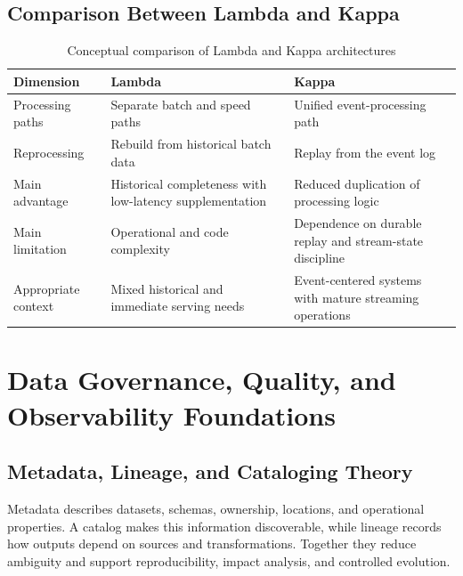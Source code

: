 \subsection{Comparison Between Lambda and Kappa}
\begin{table}[htbp]
    \centering
    \small
    \begin{tabularx}{\textwidth}{|>{\RaggedRight\arraybackslash}p{}|>{\RaggedRight\arraybackslash}X|>{\RaggedRight\arraybackslash}X|}
        \hline
        \rowcolor{ModernTableHeader}
        \color{white}\textbf{Dimension} & \color{white}\textbf{Lambda} & \color{white}\textbf{Kappa} \\
        \hline
        Processing paths & Separate batch and speed paths & Unified event-processing path \\
        \hline
        Reprocessing & Rebuild from historical batch data & Replay from the event log \\
        \hline
        Main advantage & Historical completeness with low-latency supplementation & Reduced duplication of processing logic \\
        \hline
        Main limitation & Operational and code complexity & Dependence on durable replay and stream-state discipline \\
        \hline
        Appropriate context & Mixed historical and immediate serving needs & Event-centered systems with mature streaming operations \\
        \hline
    \end{tabularx}
    \caption{Conceptual comparison of Lambda and Kappa architectures}
    \label{tab:theory-lambda-kappa}
\end{table}

\section{Data Governance, Quality, and Observability Foundations}

\subsection{Metadata, Lineage, and Cataloging Theory}
Metadata describes datasets, schemas, ownership, locations, and operational properties. A catalog makes this information discoverable, while lineage records how outputs depend on sources and transformations. Together they reduce ambiguity and support reproducibility, impact analysis, and controlled evolution.

